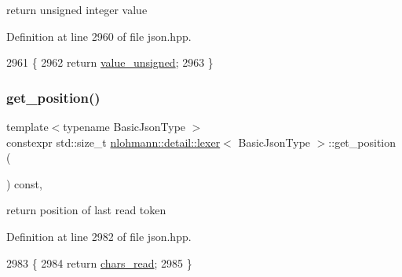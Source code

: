 return unsigned integer value 



Definition at line 2960 of file json.\+hpp.


\begin{DoxyCode}
2961     \{
2962         \textcolor{keywordflow}{return} \hyperlink{classnlohmann_1_1detail_1_1lexer_af250180459c23ca71c3e10a99fb5ba3e}{value\_unsigned};
2963     \}
\end{DoxyCode}
\mbox{\label{classnlohmann_1_1detail_1_1lexer_a2a00465a3d5d70c84809cdb27658db79}} 
\subsubsection{\texorpdfstring{get\+\_\+position()}{get\_position()}}
{\footnotesize\ttfamily template$<$typename Basic\+Json\+Type $>$ \\
constexpr std\+::size\+\_\+t \hyperlink{classnlohmann_1_1detail_1_1lexer}{nlohmann\+::detail\+::lexer}$<$ Basic\+Json\+Type $>$\+::get\+\_\+position (\begin{DoxyParamCaption}{ }\end{DoxyParamCaption}) const\hspace{0.3cm}{\ttfamily [inline]}, {\ttfamily [noexcept]}}



return position of last read token 



Definition at line 2982 of file json.\+hpp.


\begin{DoxyCode}
2983     \{
2984         \textcolor{keywordflow}{return} \hyperlink{classnlohmann_1_1detail_1_1lexer_aab991bcbf230c372b276742f1790ba5b}{chars\_read};
2985     \}
\end{DoxyCode}
\mbox{\label{classnlohmann_1_1detail_1_1lexer_a4aef7e72e539be04e139c34872421f2a}} 
